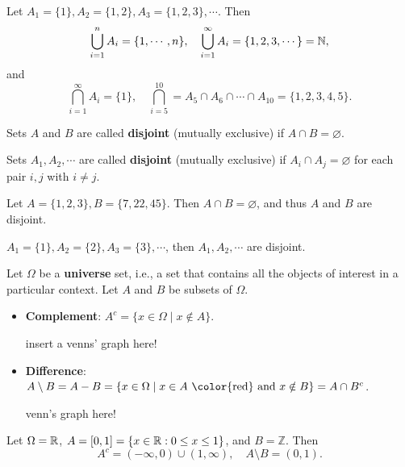   \begin{example}
    Let $A_1 = \{1\}, A_2 = \{1,2\}, A_3 = \{1,2,3\},\cdots$. Then
    \[
      \bigcup_{i=1}^n A_i = \{1,\cdots, n\}, \quad \bigcup_{i=1}^\infty A_i =
      \{1, 2, 3,\cdots\} = \mathbb{N},
    \]
    and
    \[
      \bigcap_{i=1}^\infty A_i = \{1\},\quad \bigcap_{i=5}^{10} = A_5\cap A_6
      \cap\cdots\cap A_{10} = \{1, 2, 3, 4,5\}.
    \]
  \end{example}

  \begin{definition}
    Sets $A$ and $B$ are called \textbf{disjoint} (mutually exclusive) if $A\cap
    B = \varnothing$.

    Sets $A_1, A_2,\cdots$ are called \textbf{disjoint} (mutually exclusive) if
    $A_i\cap A_j = \varnothing$ for each pair $i, j$ with $i\neq j$.
  \end{definition}

  \begin{example}
    Let $A=\{1,2,3\}, B=\{7, 22,45\}$. Then $A\cap B =\varnothing$, and thus $A$
    and $B$ are disjoint.

    $A_1 =\{1\}, A_2=\{2\}, A_3 = \{3\},\cdots$, then $A_1, A_2,\cdots$ are disjoint.
  \end{example}

  
  \begin{definition}
    Let $\Omega$ be a \textbf{universe} set, i.e., a set that contains all the
    objects of interest in a particular context. Let $A$ and $B$ be subsets of $\Omega$.
    \begin{itemize}
    \item \textbf{Complement}: $A^c = \{x\in \Omega\mid x\notin A\}$.
    
    {\color{red} insert a venns' graph here!}
    \item \textbf{Difference}: $A\setminus B =  A - B = \{x\in\Omega\mid x\in A
    ~\text{\color{red} and}~x\notin B \} = A\cap B^c$.
    
    {\color{red} venn's graph here!} 
    \end{itemize}
  \end{definition}

  \begin{example}
    Let $\Omega = \mathbb{R}$, $A = [0,1] = \{x\in \mathbb{R}: 0\le x\le 1\}$, and $B =
    \mathbb{Z}$. Then
    \[
      A^c = (-\infty, 0)\cup (1,\infty),\quad A\setminus B = (0,1).
    \]
  \end{example}

